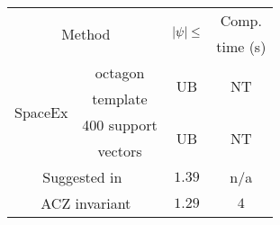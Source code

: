 \begin{table}
\begin{minipage}{0.48\textwidth}
\centering
\begin{tabular}{|l|c|c|c|}
\hline
\multicolumn{2}{|c|}{\multirow{2}{*}{Method}} &
\multirow{2}{*}{$\left|\psi\right|\leq$} & Comp.\\
\multicolumn{2}{|c|}{} & & time (s)\\
\hline
\multirow{4}{*}{SpaceEx} & octagon & \multirow{2}{*}{UB} & \multirow{2}{*}{NT}\\
& template & & \\
\cline{2-4}
& 400 support & \multirow{2}{*}{UB} & \multirow{2}{*}{NT}\\
& vectors & &\\
\hline
\multicolumn{2}{|c|}{\multirow{2}{*}{Suggested in~\cite{heinz2014benchmark}}} &
\multirow{2}{*}{$1.39$} & \multirow{2}{*}{n/a}\\
\multicolumn{2}{|c|}{} & &\\
\hline
\multicolumn{2}{|c|}{\multirow{2}{*}{ACZ invariant}} & \multirow{2}{*}{$1.29$} &
\multirow{2}{*}{$4$}\\

\end{tabular}
\end{minipage}
\end{table}
